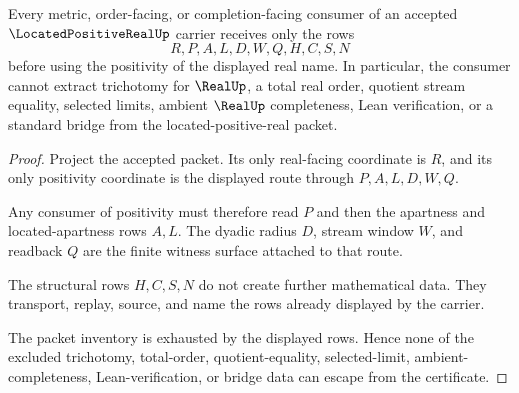 \begin{theorem}
\label{thm:located-positive-real-nonescape}
Every metric, order-facing, or completion-facing consumer of an accepted $\LocatedPositiveRealUp$ carrier receives only the rows
$$
R,P,A,L,D,W,Q,H,C,S,N
$$
before using the positivity of the displayed real name. In particular, the consumer cannot extract trichotomy for $\RealUp$, a total real order, quotient stream equality, selected limits, ambient $\RealUp$ completeness, Lean verification, or a standard bridge from the located-positive-real packet.
\end{theorem}
\begin{proof}
Project the accepted packet. Its only real-facing coordinate is $R$, and its only positivity coordinate is the displayed route through $P,A,L,D,W,Q$.

Any consumer of positivity must therefore read $P$ and then the apartness and located-apartness rows $A,L$. The dyadic radius $D$, stream window $W$, and readback $Q$ are the finite witness surface attached to that route.

The structural rows $H,C,S,N$ do not create further mathematical data. They transport, replay, source, and name the rows already displayed by the carrier.

The packet inventory is exhausted by the displayed rows. Hence none of the excluded trichotomy, total-order, quotient-equality, selected-limit, ambient-completeness, Lean-verification, or bridge data can escape from the certificate.
\end{proof}


\begin{closurestatus}{\LocatedPositiveRealUp}
  \theoryclosure{\seedClosure}
  \formalstatus{\theoremCheckedV}
\end{closurestatus}
